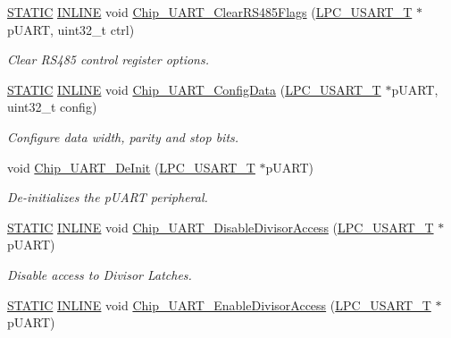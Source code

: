 \begin{DoxyCompactItemize}
\hyperlink{group__LPC__Types__Public__Macros_ga10b2d890d871e1489bb02b7e70d9bdfb}{S\+T\+A\+T\+IC} \hyperlink{group__LPC__Types__Public__Types_ga2eb6f9e0395b47b8d5e3eeae4fe0c116}{I\+N\+L\+I\+NE} void \hyperlink{group__UART__17XX__40XX_ga27379f3351109d53453dfe4833e3f350}{Chip\+\_\+\+U\+A\+R\+T\+\_\+\+Clear\+R\+S485\+Flags} (\hyperlink{structLPC__USART__T}{L\+P\+C\+\_\+\+U\+S\+A\+R\+T\+\_\+T} $\ast$p\+U\+A\+RT, uint32\+\_\+t ctrl)
\begin{DoxyCompactList}\small\item\em Clear R\+S485 control register options. \end{DoxyCompactList}\item 
\hyperlink{group__LPC__Types__Public__Macros_ga10b2d890d871e1489bb02b7e70d9bdfb}{S\+T\+A\+T\+IC} \hyperlink{group__LPC__Types__Public__Types_ga2eb6f9e0395b47b8d5e3eeae4fe0c116}{I\+N\+L\+I\+NE} void \hyperlink{group__UART__17XX__40XX_ga26626229fe35e820bf2daf6a87c43155}{Chip\+\_\+\+U\+A\+R\+T\+\_\+\+Config\+Data} (\hyperlink{structLPC__USART__T}{L\+P\+C\+\_\+\+U\+S\+A\+R\+T\+\_\+T} $\ast$p\+U\+A\+RT, uint32\+\_\+t config)
\begin{DoxyCompactList}\small\item\em Configure data width, parity and stop bits. \end{DoxyCompactList}\item 
void \hyperlink{group__UART__17XX__40XX_gaa18c4ebd4be27643e6f848472e778989}{Chip\+\_\+\+U\+A\+R\+T\+\_\+\+De\+Init} (\hyperlink{structLPC__USART__T}{L\+P\+C\+\_\+\+U\+S\+A\+R\+T\+\_\+T} $\ast$p\+U\+A\+RT)
\begin{DoxyCompactList}\small\item\em De-\/initializes the p\+U\+A\+RT peripheral. \end{DoxyCompactList}\item 
\hyperlink{group__LPC__Types__Public__Macros_ga10b2d890d871e1489bb02b7e70d9bdfb}{S\+T\+A\+T\+IC} \hyperlink{group__LPC__Types__Public__Types_ga2eb6f9e0395b47b8d5e3eeae4fe0c116}{I\+N\+L\+I\+NE} void \hyperlink{group__UART__17XX__40XX_ga81a3df6028c4b08dba38e4f6330d41d7}{Chip\+\_\+\+U\+A\+R\+T\+\_\+\+Disable\+Divisor\+Access} (\hyperlink{structLPC__USART__T}{L\+P\+C\+\_\+\+U\+S\+A\+R\+T\+\_\+T} $\ast$p\+U\+A\+RT)
\begin{DoxyCompactList}\small\item\em Disable access to Divisor Latches. \end{DoxyCompactList}\item 
\hyperlink{group__LPC__Types__Public__Macros_ga10b2d890d871e1489bb02b7e70d9bdfb}{S\+T\+A\+T\+IC} \hyperlink{group__LPC__Types__Public__Types_ga2eb6f9e0395b47b8d5e3eeae4fe0c116}{I\+N\+L\+I\+NE} void \hyperlink{group__UART__17XX__40XX_ga7a8e9260541ab5cacefcacbd94725d52}{Chip\+\_\+\+U\+A\+R\+T\+\_\+\+Enable\+Divisor\+Access} (\hyperlink{structLPC__USART__T}{L\+P\+C\+\_\+\+U\+S\+A\+R\+T\+\_\+T} $\ast$p\+U\+A\+RT)

\end{DoxyCompactItemize}
